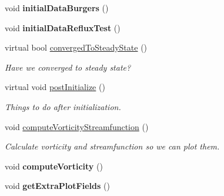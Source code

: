 \begin{DoxyCompactItemize}
\item 
\hypertarget{class_a_m_r_level_mushy_layer_aeb53defbc82746d0570b7d39e6aa5b8f}{void {\bfseries initial\-Data\-Burgers} ()}\label{class_a_m_r_level_mushy_layer_aeb53defbc82746d0570b7d39e6aa5b8f}

\item 
\hypertarget{class_a_m_r_level_mushy_layer_adb8038e986c8d16f3116e267f2532409}{void {\bfseries initial\-Data\-Reflux\-Test} ()}\label{class_a_m_r_level_mushy_layer_adb8038e986c8d16f3116e267f2532409}

\item 
\hypertarget{class_a_m_r_level_mushy_layer_a0b73c4a7644eea767d6cf1d16676809d}{virtual bool \hyperlink{class_a_m_r_level_mushy_layer_a0b73c4a7644eea767d6cf1d16676809d}{converged\-To\-Steady\-State} ()}\label{class_a_m_r_level_mushy_layer_a0b73c4a7644eea767d6cf1d16676809d}

\begin{DoxyCompactList}\small\item\em Have we converged to steady state? \end{DoxyCompactList}\item 
\hypertarget{class_a_m_r_level_mushy_layer_a596d008b356f29abf0973a88136739a9}{virtual void \hyperlink{class_a_m_r_level_mushy_layer_a596d008b356f29abf0973a88136739a9}{post\-Initialize} ()}\label{class_a_m_r_level_mushy_layer_a596d008b356f29abf0973a88136739a9}

\begin{DoxyCompactList}\small\item\em Things to do after initialization. \end{DoxyCompactList}\item 
\hypertarget{class_a_m_r_level_mushy_layer_ac26973f409362a3b1aae6828737afbb3}{void \hyperlink{class_a_m_r_level_mushy_layer_ac26973f409362a3b1aae6828737afbb3}{compute\-Vorticity\-Streamfunction} ()}\label{class_a_m_r_level_mushy_layer_ac26973f409362a3b1aae6828737afbb3}

\begin{DoxyCompactList}\small\item\em Calculate vorticity and streamfunction so we can plot them. \end{DoxyCompactList}\item 
\hypertarget{class_a_m_r_level_mushy_layer_a559c35e8c90e8da2003dac3aa6cbdf8e}{void {\bfseries compute\-Vorticity} ()}\label{class_a_m_r_level_mushy_layer_a559c35e8c90e8da2003dac3aa6cbdf8e}

\item 
\hypertarget{class_a_m_r_level_mushy_layer_a318160aa2298ae805cbb19b5f2a7f750}{void {\bfseries get\-Extra\-Plot\-Fields} ()}\label{class_a_m_r_level_mushy_layer_a318160aa2298ae805cbb19b5f2a7f750}


\end{DoxyCompactItemize}
